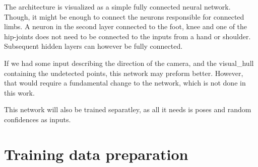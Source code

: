 The architecture is visualized as a simple fully connected neural network. Though, it might be enough to connect the neurons responsible for connected limbs. A neuron in the second layer connected to the foot, knee and one of the hip-joints does not need to be connected to the inputs from a hand or shoulder. Subsequent hidden layers can however be fully connected.

If we had some input describing the direction of the camera, and the \gls{visual_hull} containing the undetected points, this network may preform better. However, that would require a fundamental change to the network, which is not done in this work.

This network will also be trained separatley, as all it needs is poses and random confidences as inputs.


\section{Training data preparation}

